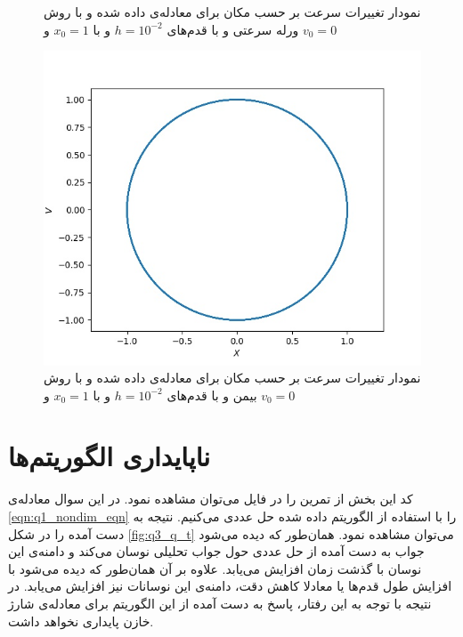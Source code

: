 \documentclass[11pt, a4paper]{article}
\begin{document}
\begin{figure}[h!]
\begin{minipage}[b]{0.4\textwidth}
    \caption{نمودار تغییرات سرعت بر حسب مکان برای معادله‌ی داده شده و با روش ورله سرعتی و با قدم‌های $h = 10^{-2}$ و با $x_0 = 1$ و $v_0 = 0$}
    \label{fig:q2_velocity_verlet}
  \end{minipage}
  \begin{minipage}[b]{0.4\textwidth}
    \includegraphics[width=\textwidth]{q2_v_x_Beeman Method_0_62.83185307179586_0.01_[1, 0].jpg}
    \caption{نمودار تغییرات سرعت بر حسب مکان برای معادله‌ی داده شده و با روش بیمن و با قدم‌های $h = 10^{-2}$ و با $x_0 = 1$ و $v_0 = 0$}
    \label{fig:q2_beeman}
  \end{minipage}
\end{figure}


\section{\textbf{ناپایداری الگوریتم‌ها}}
کد این بخش از تمرین را در فایل
می‌توان مشاهده نمود.
در این سوال معادله‌ی
\eqref{eqn:q1_nondim_eqn}
را با استفاده از الگوریتم داده شده حل عددی می‌کنیم.
نتیجه به دست آمده را در شکل
\ref{fig:q3_q_t}
می‌توان مشاهده نمود.
همان‌طور که دیده می‌شود جواب به دست آمده از حل عددی حول جواب تحلیلی نوسان می‌کند و دامنه‌ی این نوسان با گذشت زمان افزایش می‌یابد.
علاوه بر آن همان‌طور که دیده می‌شود 
با افزایش طول قدم‌ها یا معادلا کاهش دقت،
دامنه‌ی این نوسانات نیز افزایش می‌یابد.
در نتیجه با توجه به این رفتار،
پاسخ به دست آمده از این الگوریتم برای معادله‌ی شارژ خازن پایداری نخواهد داشت.
\end{document}
